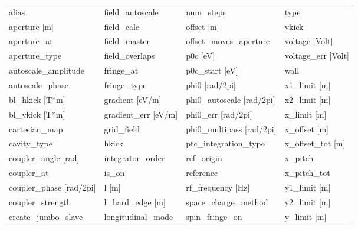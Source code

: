  \begin{tabular}{llll} \toprule
alias                          & field_autoscale                & num_steps                      & type                           \\
aperture [m]                   & field_calc                     & offset [m]                     & vkick                          \\
aperture_at                    & field_master                   & offset_moves_aperture          & voltage [Volt]                 \\
aperture_type                  & field_overlaps                 & p0c [eV]                       & voltage_err [Volt]             \\
autoscale_amplitude            & fringe_at                      & p0c_start [eV]                 & wall                           \\
autoscale_phase                & fringe_type                    & phi0 [rad/2pi]                 & x1_limit [m]                   \\
bl_hkick [T*m]                 & gradient [eV/m]                & phi0_autoscale [rad/2pi]       & x2_limit [m]                   \\
bl_vkick [T*m]                 & gradient_err [eV/m]            & phi0_err [rad/2pi]             & x_limit [m]                    \\
cartesian_map                  & grid_field                     & phi0_multipass [rad/2pi]       & x_offset [m]                   \\
cavity_type                    & hkick                          & ptc_integration_type           & x_offset_tot [m]               \\
coupler_angle [rad]            & integrator_order               & ref_origin                     & x_pitch                        \\
coupler_at                     & is_on                          & reference                      & x_pitch_tot                    \\
coupler_phase [rad/2pi]        & l [m]                          & rf_frequency [Hz]              & y1_limit [m]                   \\
coupler_strength               & l_hard_edge [m]                & space_charge_method            & y2_limit [m]                   \\
create_jumbo_slave             & longitudinal_mode              & spin_fringe_on                 & y_limit [m]                    \\

\end{tabular}
